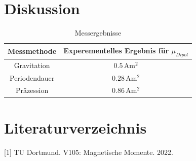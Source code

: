 \documentclass[
  bibliography=totoc,     %
  captions=tableheading,  %
  titlepage=firstiscover, %
]{scrartcl}
\begin{document}
  \newpage
  \section{Diskussion}
  \begin{table}[h]
    \centering
    \begin{tabular}{c c}
       Messmethode & Experementelles Ergebnis für $\mu_{Dipol}$\\
      \toprule
         Gravitation & $0.5\,\si{\ampere\meter^2}$ \\
         Periodendauer & $0.28\,\si{\ampere\meter^2}$ \\
         Präzession & $ 0.86\,\si{\ampere\meter^2}$\\
      \bottomrule
    \end{tabular}
    \caption{Messergebnisse}
  \end{table}




  \newpage
  \section{Literaturverzeichnis}
  [1] TU Dortmund. V105: Magnetische Momente. 2022.
\end{document}
